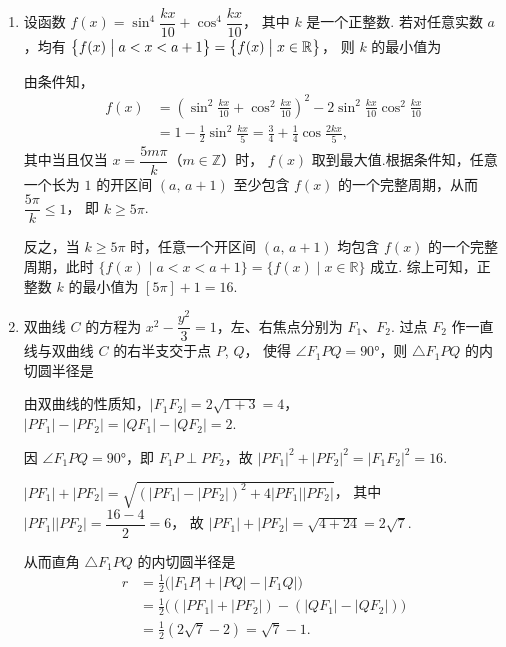\documentclass{chsmc}
\begin{document}
\begin{enumerate}
  \item 设函数
    $f(x) = \sin^4 \dfrac{kx}{10} + \cos^4 \dfrac{kx}{10}$，
    其中 $k$ 是一个正整数. 若对任意实数 $a$，均有
    $\bigl\{ f(x) \bigm| a < x < a + 1 \bigr\}
     = \bigl\{ f(x) \bigm| x \in \mathbb{R} \bigr\}$，
    则 $k$ 的最小值为\blankline
    \begin{solution}
      由条件知，
      \begin{align*}
        f(x) & = \left(\sin^2 \frac{kx}{10}
               + \cos^2 \frac{kx}{10}\right)^2
               - 2\sin^2 \frac{kx}{10}\cos^2 \frac{kx}{10} \\
             & = 1 - \frac{1}{2}\sin^2 \frac{kx}{5}
               = \frac{3}{4} + \frac{1}{4}\cos\frac{2kx}{5},
      \end{align*}
      其中当且仅当 $x = \dfrac{5m\pi}{k}$（$m \in \mathbb{Z}$）时，
      $f(x)$ 取到最大值.根据条件知，任意一个长为 $1$ 的开区间 $(a,\,a+1)$
      至少包含 $f(x)$ 的一个完整周期，从而 $\dfrac{5\pi}{k} \leq 1$，
      即 $k \geq 5\pi$.

      反之，当 $k \geq 5\pi$ 时，任意一个开区间 $(a,\,a+1)$ 均包含
      $f(x)$ 的一个完整周期，此时
      $\{f(x) \mid a < x < a+1\} = \{f(x) \mid x \in \mathbb{R}\}$ 成立.
      综上可知，正整数 $k$ 的最小值为 $[5\pi]+1 = 16$.
    \end{solution}

  \item 双曲线 $C$ 的方程为 $x^2 - \dfrac{y^2}{3} = 1$，左、右焦点分别为 $F_1$、$F_2$.
    过点 $F_2$ 作一直线与双曲线 $C$ 的右半支交于点 $P$, $Q$，
    使得 $\angle F_1 PQ = 90°$，则 $\triangle F_1 PQ$ 的内切圆半径是\blankline
    \begin{solution}
      由双曲线的性质知，$|F_1 F_2| = 2\sqrt{1 + 3} = 4$，
      $|PF_1| - |PF_2| = |QF_1| - |QF_2| = 2$.

      因 $\angle F_1 PQ = 90°$，即 $F_1 P \perp PF_2$，故
      $|PF_1|^2 + |PF_2|^2 = |F_1 F_2|^2 = 16$.

      $|PF_1| + |PF_2|
       = \sqrt{(|PF_1| - |PF_2|)^2 + 4|PF_1||PF_2|}$，
      其中 $|PF_1||PF_2| = \dfrac{16 - 4}{2} = 6$，
      故 $|PF_1| + |PF_2| = \sqrt{4 + 24} = 2\sqrt{7}$.

      从而直角 $\triangle F_1 PQ$ 的内切圆半径是
      \begin{align*}
        r &= \frac{1}{2}\bigl(|F_1 P| + |PQ| - |F_1 Q|\bigr) \\
          &= \frac{1}{2}\bigl((|PF_1| + |PF_2|) - (|QF_1| - |QF_2|)\bigr) \\
          &= \frac{1}{2}(2\sqrt{7} - 2) = \sqrt{7} - 1.
      \end{align*}
    \end{solution}


\end{enumerate}
\end{document}

